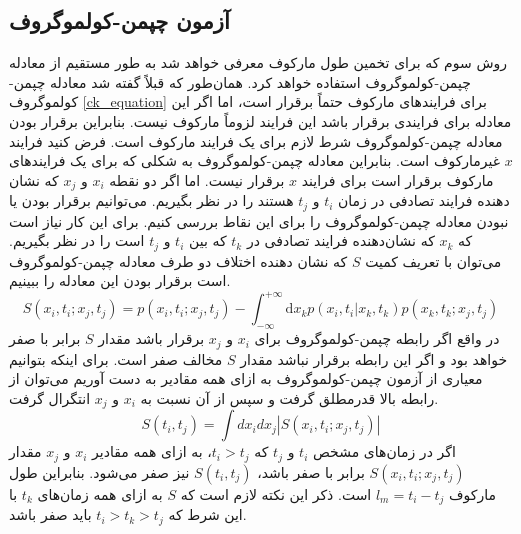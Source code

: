 \subsection{آزمون چپمن-کولموگروف}

روش سوم که برای تخمین طول مارکوف معرفی خواهد شد به طور مستقیم از معادله چپمن-کولموگروف استفاده خواهد کرد.
همان‌طور که قبلاً گفته شد معادله چپمن-کولموگروف \ref{ck_equation} برای فرایندهای مارکوف حتماً برقرار است، اما اگر این معادله برای فرایندی برقرار باشد این فرایند لزوماً مارکوف نیست. بنابراین 
برقرار بودن معادله چپمن-کولموگروف شرط لازم برای یک فرایند مارکوف است.
فرض کنید فرایند $x$ غیرمارکوف است. بنابراین معادله چپمن-کولموگروف به شکلی که برای 
یک فرایندهای مارکوف برقرار است برای فرایند $x$ برقرار نیست. اما اگر 
دو نقطه $x_i$ و $x_j$ که نشان دهنده 
فرایند تصادفی در زمان $t_i$ و $t_j$ هستند را در نظر بگیریم. می‌توانیم برقرار بودن یا نبودن 
معادله چپمن-کولموگروف را برای این نقاط بررسی کنیم. برای این کار نیاز است که $x_k$ که نشان‌دهنده 
فرایند تصادفی در $t_k$ که بین $t_i$ و $t_j$ است را در نظر بگیریم.
می‌توان با تعریف کمیت $S$ که نشان دهنده اختلاف دو طرف معادله چپمن-کولموگروف است برقرار بودن این معادله را ببینیم.
\begin{equation}
  S ( x_i, t_i; x_j, t_j ) =  p(x_{i},t_{i};x_{j},t_{j} ) - \int_{-\infty}^{+\infty} \mathrm{d} x_k p(x_{i},t_{i}|x_k,t_k) p(x_k,t_k;x_{j},t_{j})
  \label{chapmann_test}
\end{equation}
در واقع اگر رابطه چپمن-کولموگروف برای $x_i$ و $x_j$ برقرار باشد مقدار $S$ برابر با صفر خواهد بود و 
اگر این رابطه برقرار نباشد مقدار $S$ مخالف صفر است.
برای اینکه بتوانیم معیاری از آزمون چپمن-کولموگروف به ازای همه مقادیر به دست 
آوریم می‌توان از رابطه بالا قدرمطلق گرفت و سپس از آن نسبت به $x_i$ و $x_j$ انتگرال گرفت.
\begin{equation}
  S ( t_i, t_j ) = \int dx_i dx_j \left| S ( x_i, t_i; x_j, t_j ) \right|
  \label{chapmann_test_int}
\end{equation}
اگر در زمان‌های مشخص $t_{i}$ و $t_{j}$ که $t_{i} > t_{j}$، به ازای 
همه مقادیر $x_{i}$ و $x_{j}$ مقدار $S( x_i, t_i; x_j, t_j )$ برابر با 
صفر باشد، $S( t_i, t_j )$ 
نیز صفر می‌شود. بنابراین طول مارکوف $l_m = t_{i} - t_{j}$ است. ذکر این نکته لازم است که $S$ 
به ازای همه زمان‌های $t_k$ با این شرط که $t_{i} > t_k > t_{j}$ باید صفر باشد.\cite{fazeli_probing_2008}

